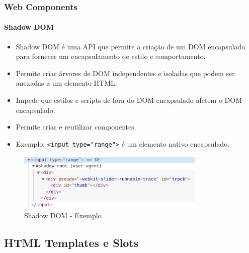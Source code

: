 \documentclass[
	9pt, %
	t, %
]{beamer}
\begin{document}
\begin{frame}
	\frametitle{Web Components}
	\framesubtitle{Shadow DOM}
	\begin{itemize}
		\item Shadow DOM é uma API que permite a criação de um DOM encapsulado para fornecer
		      um encapsulamento de estilo e comportamento.
		\item Permite criar árvores de DOM independentes e isoladas que podem ser anexadas a
		      um elemento HTML.
		\item Impede que estilos e scripts de fora do DOM encapsulado afetem o DOM
		      encapsulado.
		\item Permite criar e reutilizar componentes.
		\item Exemplo: \texttt{<input type="range">} é um elemento nativo encapsulado.
	\end{itemize}

	\begin{figure}
		\centering
		\includegraphics[width=0.8\textwidth]{shadow_dom_example.png}
		\caption{Shadow DOM - Exemplo}
	\end{figure}

\end{frame}

\subsection{HTML Templates e Slots}
\end{document}
